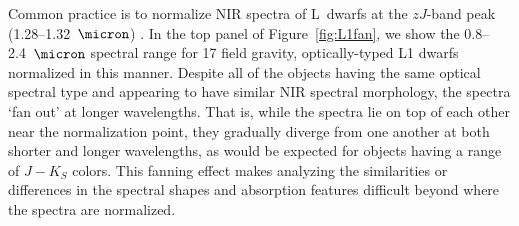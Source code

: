 \documentclass[12pt,preprint]{aastex}
\begin{document}
Common practice is to normalize NIR spectra of L~dwarfs at the $zJ$-band peak (1.28--1.32~$\micron$) \citep[e.g.,][]{Kirkpatrick10}.
In the top panel of Figure~\ref{fig:L1fan}, we show the 0.8--2.4~$\micron$ spectral range for 17 field gravity, optically-typed L1 dwarfs normalized in this manner.
Despite all of the objects having the same optical spectral type and appearing to have similar NIR spectral morphology, the spectra `fan out' at longer wavelengths.
That is, while the spectra lie on top of each other near the normalization point, they gradually diverge from one another at both shorter and longer wavelengths, as would be expected for objects having a range of $J-K_S$ colors.
This fanning effect makes analyzing the similarities or differences in the spectral shapes and absorption features difficult beyond where the spectra are normalized.

\end{document}
